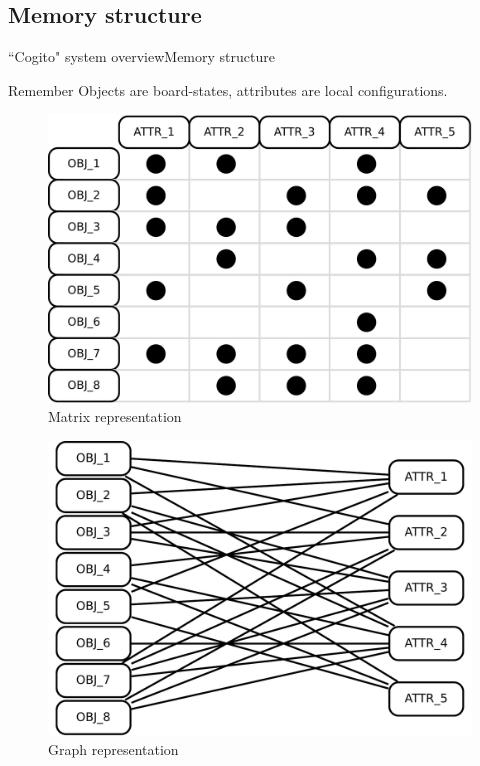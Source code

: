 \subsection{Memory structure}
\begin{frame}{``Cogito" system overview}{Memory structure}

\begin{block}{Remember}
Objects are board-states, attributes are local configurations.
\end{block}

\begin{figure}[ht]
  \begin{minipage}[t]{0.45\linewidth}
    \vspace{0pt}
    \centering
    \includegraphics[width=\textwidth]{img/cogito/context_matrix}
    \\ Matrix representation
  \end{minipage}
  \hfill
  \begin{minipage}[t]{0.45\textwidth}
    \vspace{0pt}
    \centering
    \includegraphics[width=\textwidth]{img/cogito/context_graph}
    \\ Graph representation
  \end{minipage}
\end{figure}

\end{frame}
